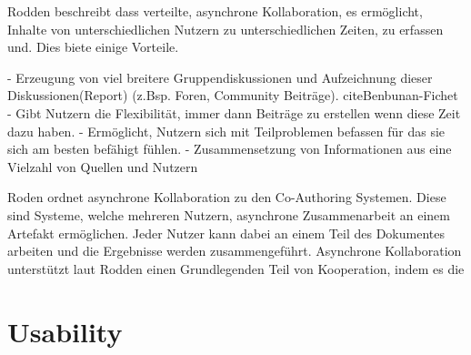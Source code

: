 Rodden \cite{Rodden1992} beschreibt dass verteilte, asynchrone Kollaboration, es ermöglicht, Inhalte von unterschiedlichen Nutzern zu unterschiedlichen Zeiten, zu erfassen und.
Dies biete einige Vorteile.

- Erzeugung von viel breitere Gruppendiskussionen und Aufzeichnung dieser Diskussionen(Report) (z.Bsp. Foren, Community Beiträge).\cite{Rodden1992} cite{Benbunan-Fichet} 
- Gibt Nutzern die Flexibilität, immer dann Beiträge zu erstellen wenn diese Zeit dazu haben.
- Ermöglicht, Nutzern sich mit Teilproblemen befassen für das sie sich am besten befähigt fühlen.
- Zusammensetzung von Informationen aus eine Vielzahl von Quellen und Nutzern


Roden \cite{Rodden1992} ordnet asynchrone Kollaboration zu den Co-Authoring Systemen. Diese sind Systeme, welche mehreren Nutzern, asynchrone Zusammenarbeit 
an einem Artefakt ermöglichen. Jeder Nutzer kann dabei an einem Teil des Dokumentes arbeiten und die Ergebnisse werden zusammengeführt. Asynchrone Kollaboration 
unterstützt laut Rodden einen Grundlegenden Teil von Kooperation, indem es die 




\section{Usability}


